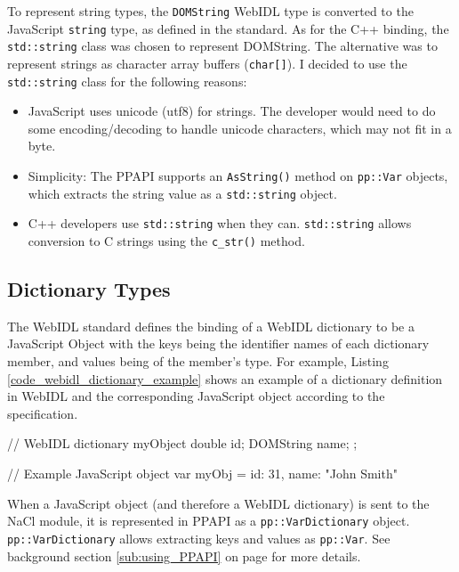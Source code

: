 To represent string types, the \lstinline{DOMString} WebIDL type is converted to the JavaScript \lstinline{string} type, as defined in the standard. As for the C++ binding, the \lstinline{std::string} class was chosen to represent DOMString. The alternative was to represent strings as character array buffers (\lstinline{char[]}). I decided to use the \lstinline{std::string} class for the following reasons:

\begin{itemize}
	\item JavaScript uses unicode (utf8) for strings. The developer would need to do some encoding/decoding to handle unicode characters, which may not fit in a byte.
	\item Simplicity: The PPAPI supports an \lstinline{AsString()} method on \lstinline{pp::Var} objects, which extracts the string value as a \lstinline{std::string} object.
	\item C++ developers use \lstinline{std::string} when they can. \lstinline{std::string} allows conversion to C strings using the \lstinline{c_str()} method.
\end{itemize}


\subsection{Dictionary Types} %
\label{sub:dictionary_types}
The WebIDL standard defines the binding of a WebIDL dictionary to be a JavaScript Object with the keys being the identifier names of each dictionary member, and values being of the member's type. For example, Listing \ref{code_webidl_dictionary_example} shows an example of a dictionary definition in WebIDL and the corresponding JavaScript object according to the specification.

\begin{code}
// WebIDL
dictionary myObject {
  double id;
  DOMString name;
};

// Example JavaScript object
var myObj = {
  id: 31,
  name: "John Smith"
}
\end{code}

When a JavaScript object (and therefore a WebIDL dictionary) is sent to the NaCl module, it is represented in PPAPI as a \lstinline{pp::VarDictionary} object. \lstinline{pp::VarDictionary} allows extracting keys and values as \lstinline{pp::Var}. See background section \ref{sub:using_PPAPI} on page \pageref{sub:using_PPAPI} for more details.

